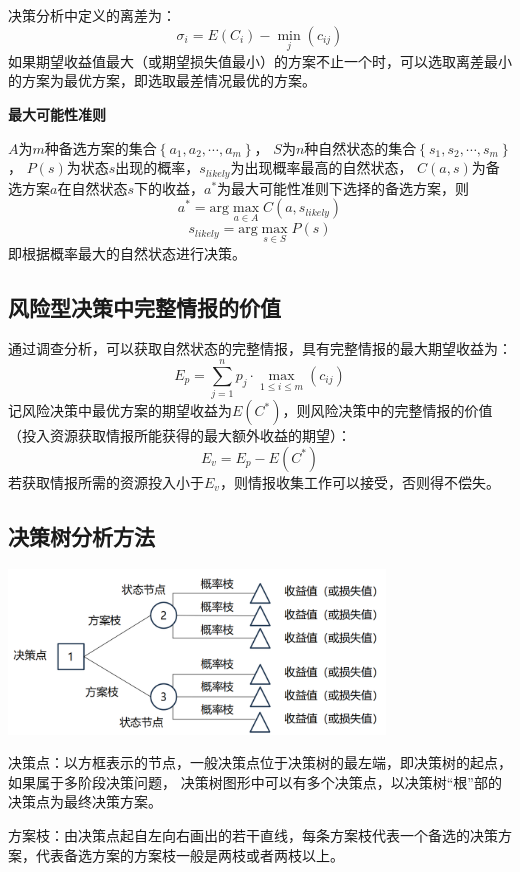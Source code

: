 \documentclass[a4paper,12pt]{article}
\begin{document}
决策分析中定义的离差为：
$$
\sigma_{i}=E(C_{i})-\min_{j}(c_{ij})
$$
如果期望收益值最大（或期望损失值最小）的方案不止一个时，可以选取离差最小的方案为最优方案，即选取最差情况最优的方案。

\noindent
\textbf{最大可能性准则}

$A$为$m$种备选方案的集合$\left\{a_{1},a_{2},\cdots,a_{m}\right\}$，
$S$为$n$种自然状态的集合$\left\{s_{1},s_{2},\cdots,s_{m}\right\}$，
$P(s)$为状态$s$出现的概率，$s_{likely}$为出现概率最高的自然状态，
$C(a,s)$为备选方案$a$在自然状态$s$下的收益，$a^*$为最大可能性准则下选择的备选方案，则
$$
a^*=\text{arg}\max_{a\in A}C\left(a,s_{likely}\right)
$$
$$
s_{likely}=\text{arg}\max_{s\in S}P\left(s\right)
$$
即根据概率最大的自然状态进行决策。

\subsection{风险型决策中完整情报的价值}

通过调查分析，可以获取自然状态的完整情报，具有完整情报的最大期望收益为：
$$
E_p=\sum_{j=1}^np_j\cdot \max_{1\le i\le m}\left(c_{ij}\right)
$$
记风险决策中最优方案的期望收益为$E(C^*)$，则风险决策中的完整情报的价值（投入资源获取情报所能获得的最大额外收益的期望）：
$$
E_v=E_p-E(C^*)
$$
若获取情报所需的资源投入小于$E_v$，则情报收集工作可以接受，否则得不偿失。

\subsection{决策树分析方法}

\begin{center}
    \includegraphics[width=10cm]{决策树.png}
\end{center}

决策点：以方框表示的节点，一般决策点位于决策树的最左端，即决策树的起点，如果属于多阶段决策问题，
决策树图形中可以有多个决策点，以决策树“根”部的决策点为最终决策方案。

方案枝：由决策点起自左向右画出的若干直线，每条方案枝代表一个备选的决策方案，代表备选方案的方案枝一般是两枝或者两枝以上。
\end{document}
